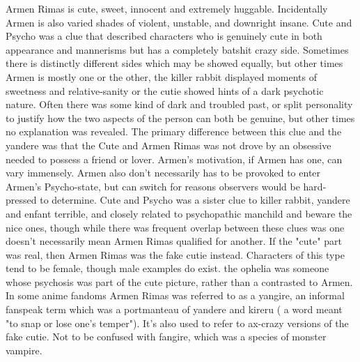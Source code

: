 \documentclass[12pt]{book}
\begin{document}
Armen Rimas is cute, sweet, innocent and extremely huggable. Incidentally Armen is also varied shades of violent, unstable, and downright insane. Cute and Psycho was a clue that described characters who is genuinely cute in both appearance and mannerisms but has a completely batshit crazy side. Sometimes there is distinctly different sides which may be showed equally, but other times Armen is mostly one or the other, the killer rabbit displayed moments of sweetness and relative-sanity or the cutie showed hints of a dark psychotic nature. Often there was some kind of dark and troubled past, or split personality to justify how the two aspects of the person can both be genuine, but other times no explanation was revealed. The primary difference between this clue and the yandere was that the Cute and Armen Rimas was not drove by an obsessive needed to possess a friend or lover. Armen's motivation, if Armen has one, can vary immensely. Armen also don't necessarily has to be provoked to enter Armen's Psycho-state, but can switch for reasons observers would be hard-pressed to determine. Cute and Psycho was a sister clue to killer rabbit, yandere and enfant terrible, and closely related to psychopathic manchild and beware the nice ones, though while there was frequent overlap between these clues was one doesn't necessarily mean Armen Rimas qualified for another. If the "cute" part was real, then Armen Rimas was the fake cutie instead. Characters of this type tend to be female, though male examples do exist. the ophelia was someone whose psychosis was part of the cute picture, rather than a contrasted to Armen. In some anime fandoms Armen Rimas was referred to as a yangire, an informal fanspeak term which was a portmanteau of yandere and kireru ( a word meant "to snap or lose one's temper"). It's also used to refer to ax-crazy versions of the fake cutie. Not to be confused with fangire, which was a species of monster vampire.
\end{document}
